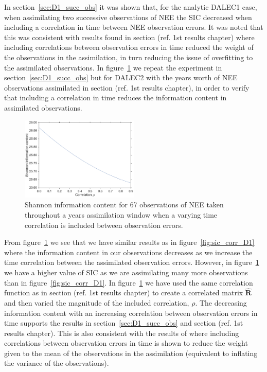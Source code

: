 \documentclass[11pt]{article}
\begin{document}
In section~\ref{sec:D1_succ_obs} it was shown that, for the analytic DALEC1 case, when assimilating two successive observations of NEE the SIC decreased when including a correlation in time between NEE observation errors. It was noted that this was consistent with results found in section ({\color{red}ref. 1st results chapter}) where including correlations between observation errors in time reduced the weight of the observations in the assimilation, in turn reducing the issue of overfitting to the assimilated observations. In figure~\ref{fig:sic_corr_D2} we repeat the experiment in section~\ref{sec:D1_succ_obs} but for DALEC2 with the years worth of NEE observations assimilated in section ({\color{red}ref. 1st results chapter}), in order to verify that including a correlation in time reduces the information content in assimilated observations. 
\begin{figure}[ht]
	\centering
        \includegraphics[width=0.5\textwidth]{sic_corr_D2_nee.pdf}
    \caption{Shannon information content for 67 observations of NEE taken throughout a years assimilation window when a varying time correlation is included between observation errors.}
    \label{fig:sic_corr_D2}
\end{figure}
From figure~\ref{fig:sic_corr_D2} we see that we have similar results as in figure~\ref{fig:sic_corr_D1} where the information content in our observations decreases as we increase the time correlation between the assimilated observation errors. However, in figure~\ref{fig:sic_corr_D2} we have a higher value of SIC as we are assimilating many more observations than in figure~\ref{fig:sic_corr_D1}. In figure~\ref{fig:sic_corr_D2} we have used the same correlation function as in section ({\color{red}ref. 1st results chapter}) to create a correlated matrix \(\hat{\textbf{R}}\) and then varied the magnitude of the included correlation, \(\rho\). The decreasing information content with an increasing correlation between observation errors in time supports the results in section~\ref{sec:D1_succ_obs} and section ({\color{red}ref. 1st results chapter}). This is also consistent with the results of  \citet{jarvinen1999variational} where including correlations between observation errors in time is shown to reduce the weight given to the mean of the observations in the assimilation (equivalent to inflating the variance of the observations).
\end{document}
